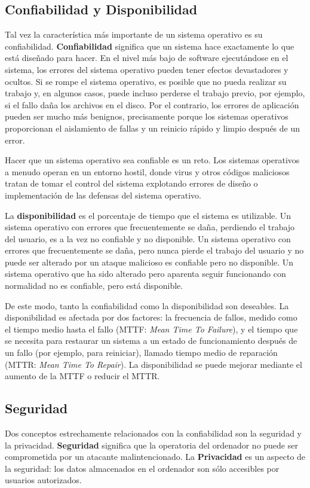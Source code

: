 \documentclass[10pt]{book}
\begin{document}
\subsection{Confiabilidad y Disponibilidad}
Tal vez la característica más importante de un sistema operativo es su confiabilidad. \textbf{Confiabilidad} significa que un sistema hace exactamente lo que está diseñado para hacer. En el nivel más bajo de software ejecutándose en el sistema, los errores del sistema operativo pueden tener efectos devastadores y ocultos. Si se rompe el sistema operativo, es posible que no pueda realizar su trabajo y, en algunos casos, puede incluso perderse el trabajo previo, por ejemplo, si el fallo daña los archivos en el disco. Por el contrario, los errores de aplicación pueden ser mucho más benignos, precisamente porque los sistemas operativos proporcionan el aislamiento de fallas y un reinicio rápido y limpio después de un error.

Hacer que un sistema operativo sea confiable es un reto. Los sistemas operativos a menudo operan en un entorno hostil, donde virus y otros códigos maliciosos tratan de tomar el control del sistema explotando errores de diseño o implementación de las defensas del sistema operativo.

La \textbf{disponibilidad} es el porcentaje de tiempo que el sistema es utilizable. Un sistema operativo con errores que frecuentemente se daña, perdiendo el trabajo del usuario, es a la vez no confiable y no disponible. Un sistema operativo con errores que frecuentemente se daña, pero nunca pierde el trabajo del usuario y no puede ser alterado por un ataque malicioso es confiable pero no disponible. Un sistema operativo que ha sido alterado pero aparenta seguir funcionando con normalidad no es confiable, pero está disponible.

De este modo, tanto la confiabilidad como la disponibilidad son deseables. La disponibilidad es afectada por dos factores: la frecuencia de fallos, medido como el tiempo medio hasta el fallo (MTTF: \textit{Mean Time To Failure}), y el tiempo que se necesita para restaurar un sistema a un estado de funcionamiento después de un fallo (por ejemplo, para reiniciar), llamado tiempo medio de reparación (MTTR: \textit{Mean Time To Repair}). La disponibilidad se puede mejorar mediante el aumento de la MTTF o reducir el MTTR.

\subsection{Seguridad}
Dos conceptos estrechamente relacionados con la confiabilidad son la seguridad y la privacidad. \textbf{Seguridad} significa que la operatoria del ordenador no puede ser comprometida por un atacante malintencionado. La \textbf{Privacidad} es un aspecto de la seguridad: los datos almacenados en el ordenador son sólo accesibles por usuarios autorizados.
\end{document}
